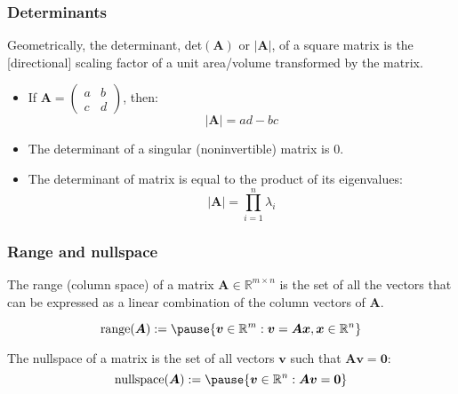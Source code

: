 \documentclass[smaller]{beamer}
\newcommand{\?}{\stackrel{?}{=}}
\newcommand{\la}{\lambda}
\newcommand{\mb}{\mathbb}
\begin{document}
\begin{frame}
  \frametitle{Determinants}
  \pause

  Geometrically, the determinant, det$(\bm A)$ or $|\bm A|$, of a square
  matrix is the [directional] scaling factor of a unit area/volume
  transformed by the matrix. \pause

  \begin{itemize}
  \item If $\bm A =
    \begin{pmatrix}
      a & b \\ c & d
    \end{pmatrix}$, then:
    \pause
    \begin{equation}
      |\bm A| = ad - bc
    \end{equation}
    \pause
  \item The determinant of a singular (noninvertible) matrix is 0.
    \pause
  \item The determinant of matrix is equal to the product of its
    eigenvalues:
\pause
\begin{equation}
  |\bm A| = \prod_{i=1}^n \la_i
\end{equation}
  \end{itemize}
\end{frame}



\begin{frame}
  \frametitle{Range and nullspace}
  \pause

  The range (column space) of a matrix $\bm A\in \mb{R}^{m\times n}$ is the set of all the vectors that can be
  expressed as a linear combination of the column vectors of $\bm A$.
\pause

\begin{equation}
  \text{range}(\bm A) := \pause \{\bm v \in \mb{R}^m: \bm v = \bm A\bm
  x, \bm x \in \mb{R}^n\}
\end{equation}

\pause

The nullspace of a matrix is the set of all vectors $\bm v$ such that
$\bm A\bm v = \bm 0$: \pause
\begin{equation}
  \text{nullspace}(\bm A) := \pause \{\bm v \in \mb{R}^n: \bm A\bm v =
  \bm 0\}
\end{equation}

\end{frame}
\end{document}
